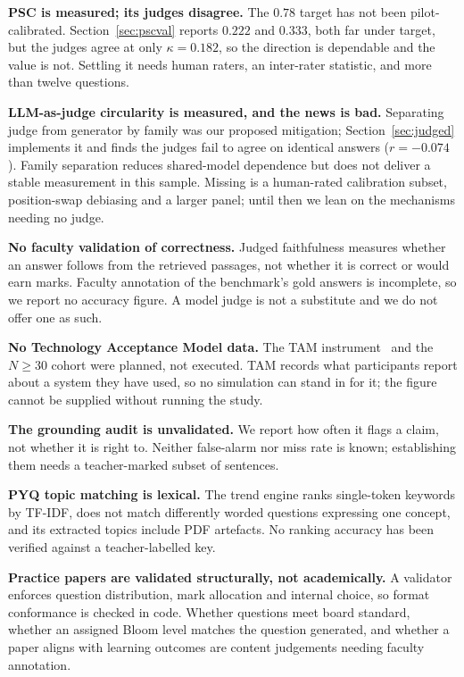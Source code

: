 \documentclass[conference]{IEEEtran}
\begin{document}
\textbf{PSC is measured; its judges disagree.} The $0.78$ target has not been pilot-calibrated. Section~\ref{sec:pscval} reports $0.222$ and $0.333$, both far under
target, but the judges agree at only $\kappa = 0.182$, so the direction is
dependable and the value is not. Settling it needs human raters, an inter-rater
statistic, and more than twelve questions.

\textbf{LLM-as-judge circularity is measured, and the news is bad.} Separating
judge from generator by family was our proposed mitigation;
Section~\ref{sec:judged} implements it and finds the judges fail to agree on
identical answers ($r = -0.074$). Family separation reduces shared-model dependence but does not deliver a
stable measurement in this sample. Missing is a human-rated calibration subset,
position-swap debiasing and a larger panel; until then we lean on the
mechanisms needing no judge.

\textbf{No faculty validation of correctness.} Judged faithfulness measures
whether an answer follows from the retrieved passages, not whether it is
correct or would earn marks. Faculty annotation of the benchmark's gold answers
is incomplete, so we report no accuracy figure. A model judge is not a
substitute and we do not offer one as such.

\textbf{No Technology Acceptance Model data.} The TAM
instrument~\cite{davis1989} and the $N \geq 30$ cohort were planned, not
executed. TAM records what participants report about a system they have used,
so no simulation can stand in for it; the figure cannot be supplied without
running the study.

\textbf{The grounding audit is unvalidated.} We report how often it flags a
claim, not whether it is right to. Neither false-alarm nor miss rate is known;
establishing them needs a teacher-marked subset of sentences.

\textbf{PYQ topic matching is lexical.} The trend engine ranks single-token
keywords by TF-IDF, does not match differently worded questions expressing one
concept, and its extracted topics include PDF artefacts. No ranking accuracy
has been verified against a teacher-labelled key.

\textbf{Practice papers are validated structurally, not academically.} A
validator enforces question distribution, mark allocation and internal choice,
so format conformance is checked in code. Whether questions meet board
standard, whether an assigned Bloom level matches the question generated, and
whether a paper aligns with learning outcomes are content judgements needing
faculty annotation.
\end{document}
